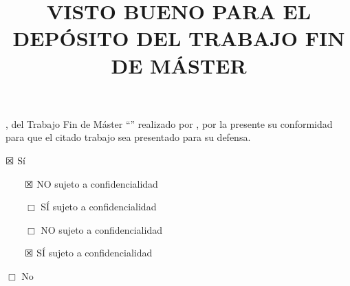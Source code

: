 \documentclass[11pt,a4paper,oneside]{article}
\title{VISTO BUENO \MakeUppercase{\wordDelOrDeLos{}
    \wordTutorOrTutores} PARA EL DEPÓSITO DEL TRABAJO FIN DE MÁSTER}
\date{}                                            %
\begin{document}

{\Large
\maketitle 

\thispagestyle{empty}


\myAdvisorsWithDonOrDona, \wordTutorOrTutores{} del Trabajo Fin de Máster
``\myBookTitle'' realizado por \wordDonOrDonaAutor{} \myAuthorFullName, por la
presente \wordDaOrDan{} su conformidad para que el citado trabajo sea
presentado para su defensa.

\vspace{1cm}

$\XBox$ Sí

{
  \vspace{0.5cm}
  {
    ~~~~$\XBox$ NO sujeto a confidencialidad
    
    \vspace{0.5cm}
    
    ~~~~$\Box$ SÍ sujeto a confidencialidad
    
  }
  {
    ~~~~$\Box$ NO sujeto a confidencialidad
    
    \vspace{0.5cm}
    
    ~~~~$\XBox$ SÍ sujeto a confidencialidad
    
  }
}
{
}

\vspace{0.5cm}

$\Box$ No

\vspace{2cm}


\vspace{4cm}


}
\end{document}
